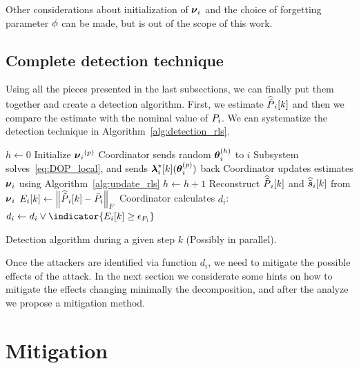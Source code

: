 \documentclass[../main.tex]{subfiles}
\begin{document}
\begin{remark}
  Other considerations about initialization of ${\boldsymbol{\nu}_{i}}$ and the choice of forgetting parameter ${\phi}$ can be made, but is out of the scope of this work.
\end{remark}

\subsection{Complete detection technique}\label{sec:compl-detect-algor}
Using all the pieces presented in the last subsections, we can finally put them together and create a detection algorithm.
First, we estimate $\widehat{\tilde{P}}_{i}[k]$ and then we compare the estimate with the nominal value of ${P}_{i}$.
We can systematize the detection technique in Algorithm~\ref{alg:detection_rls}.

\begin{algorithm2e}[h]
  \DontPrintSemicolon%
  $h\gets0$\;
  Initialize ${\boldsymbol{\nu}_{i}}^{(p)}$\;
  \Repeat{$\norm{\rlsparam\hplusone-\rlsparam\h}\leq\epsilon_{\rlsparam}$}
  {
    Coordinator sends random $\boldsymbol{\theta}_{i}^{(h)}$ to $i$ \;
    Subsystem solves~\eqref{eq:DOP_local}, and sends $\lambdaikstar(\thetai\p)$ back\;
    Coordinator updates estimates ${\boldsymbol{\nu}_{i}}$ using Algorithm~\ref{alg:update_rls}\;
    $h\gets h+1$\;
  }
  Reconstruct $\widehat{\tilde{P}}_{i}[k]$ and $\widehat{\tilde{\boldsymbol{s}}}_{i}[k]$ from ${\boldsymbol{\nu}_{i}}$\;
  $E_{i}[k]\gets\left\lVert\widehat{\tilde{P}}_{i}[k]-\bar{{P}}_{i}\right\rVert_{F}$\;
  Coordinator calculates $d_{i}$: $d_{i}\gets d_{i}\lor \indicator{E_{i}[k]\geq\epsilon_{\Plin}}$\;

  \caption{Detection algorithm during a given step $k$ (Possibly in parallel).}\label{alg:detection_rls}
\end{algorithm2e}

Once the attackers are identified via function $d_{i}$, we need to mitigate the possible effects of the attack.
In the next section we considerate some hints on how to mitigate the effects changing minimally the decomposition, and after the analyze we propose a mitigation method.

\section{Mitigation}\label{sec:mitigation}
\end{document}
